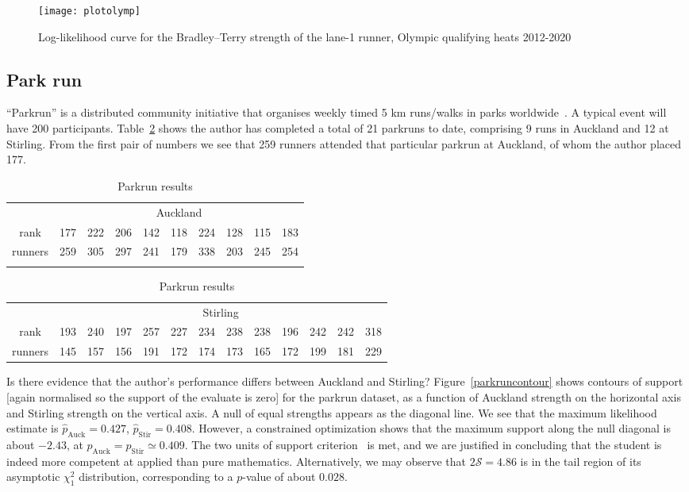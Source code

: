\documentclass[article]{ajs}
\begin{document}
\begin{figure}[t]
  \begin{centering}
\texttt{[image: plotolymp]} %
\caption{Log-likelihood curve for the Bradley--Terry strength of the
  lane-1 runner, Olympic qualifying heats 2012-2020 \label{plotolymp}}
\end{centering}
\end{figure}

\subsection{Park run}


``Parkrun'' is a distributed community initiative that organises
weekly timed 5 km runs/walks in parks worldwide~\citep{hindley2020}.
A typical event will have 200 participants.  Table~\ref{parkruntable}
shows the author has completed a total of 21 parkruns to date,
comprising 9 runs in Auckland and 12 at Stirling.  From the first pair
of numbers we see that 259 runners attended that particular parkrun at
Auckland, of whom the author placed 177.

\begin{table}[t]
  \centering
  \caption{Parkrun results}
\label{parkruntable}
\begin{tabular}{cccccccccc}\\
 & \multicolumn{9}{c}{Auckland}\\
rank   & 177& 222& 206& 142& 118& 224& 128& 115& 183\\
runners& 259& 305& 297& 241& 179& 338& 203& 245& 254\\ \\
\end{tabular}
\begin{tabular}{ccccccccccccc}
  & \multicolumn{12}{c}{Stirling}\\
rank   &  193& 240& 197& 257& 227& 234& 238& 238& 196& 242& 242& 318\\
runners&  145& 157& 156& 191& 172& 174& 173& 165& 172& 199& 181& 229\\
\end{tabular}
\end{table}

Is there evidence that the author's performance differs between
Auckland and Stirling?  Figure~\ref{parkruncontour} shows contours of
support [again normalised so the support of the evaluate is zero] for
the parkrun dataset, as a function of Auckland strength on the
horizontal axis and Stirling strength on the vertical axis.  A null of
equal strengths appears as the diagonal line.  We see that the maximum
likelihood estimate is $\hat{p}_\mathrm{Auck}=0.427$,
$\hat{p}_\mathrm{Stir}=0.408$.  However, a constrained optimization
shows that the maximum support along the null diagonal is about
$-2.43$, at ${p}_\mathrm{Auck}={p}_\mathrm{Stir}\simeq 0.409$.  The
two units of support criterion~\citep{edwards1972} is met, and we are
justified in concluding that the student is indeed more competent at
applied than pure mathematics.  Alternatively, we may observe that
$2\mathcal{S}=4.86$ is in the tail region of its asymptotic $\chi^2_1$
distribution, corresponding to a $p$-value of about $0.028$.
\end{document}
